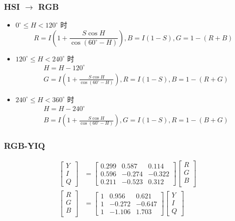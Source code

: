\documentclass{beamer}
\begin{document}
\begin{frame}
\frametitle{HSI $\to$ RGB}
\label{sec-3-4}

\begin{itemize}
\item $0^{\circ}\leq H<120^{\circ}$ 时
   \[ R = I\left(1+\frac{S\cos H}{\cos(60^{\circ}-H)}\right),B = I(1-S),G = 1-(R+B) \]
\item $120^{\circ}\leq H<240^{\circ}$ 时
   \begin{align*}
    &H =H-120^{\circ} \\
    &G = I\left(1+\frac{S\cos H}{\cos(60^{\circ}-H)}\right), R = I(1-S), B = 1-(R+G)
    \end{align*}
\item $240^{\circ}\leq H<360^{\circ}$ 时
   \begin{align*}
   &H =H-240^{\circ}\\ 
   &B = I\left(1+\frac{S\cos H}{\cos(60^{\circ}-H)}\right), G = I(1-S), R = 1-(B+G)
  \end{align*}
\end{itemize}
\end{frame}
\begin{frame}
\frametitle{RGB-YIQ}
\label{sec-3-5}

\begin{align*}
\begin{bmatrix}
Y\\
I\\
Q
\end{bmatrix}
&=
\begin{bmatrix}
 0.299 & 0.587 & 0.114 \\ 
 0.596 & -0.274 & -0.322 \\
 0.211 & -0.523 & 0.312 
\end{bmatrix}
\begin{bmatrix}
R\\
G\\
B\\
\end{bmatrix}\\
\begin{bmatrix}
R\\
G\\
B\\
\end{bmatrix}
&=
\begin{bmatrix}
 1  & 0.956 &  0.621 \\
 1  & -0.272 &  -0.647 \\
 1  & -1.106 &  1.703 
\end{bmatrix}
\begin{bmatrix}
Y\\
I\\
Q
\end{bmatrix}
\end{align*}
\end{frame}
\end{document}
